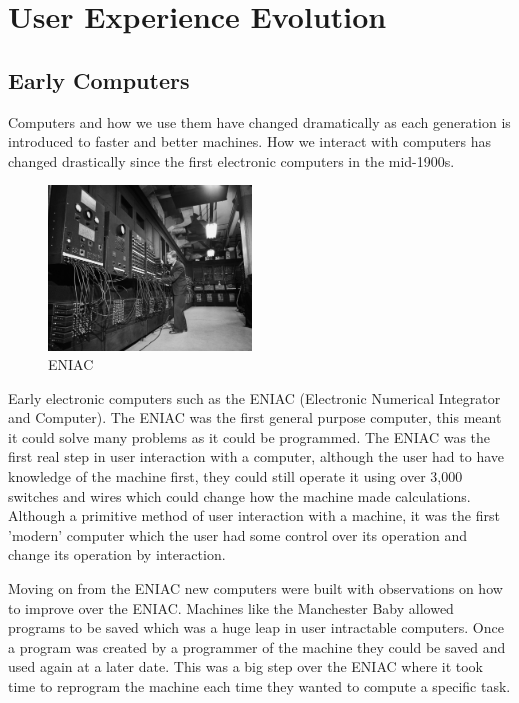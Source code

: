 \chapter{User Experience Evolution}

\section{Early Computers}
Computers and how we use them have changed dramatically as each generation is introduced to faster and better machines. How we interact with computers has changed drastically since the first electronic computers in the mid-1900s.

\begin{figure}
  \begin{center}
    \includegraphics[width=0.48\textwidth]{img/eniac.jpg}
  \end{center}
  \caption{ENIAC}
\end{figure}

Early electronic computers such as the ENIAC (Electronic Numerical Integrator and Computer). \cite{eniac} The ENIAC was the first general purpose computer, this meant it could solve many problems as it could be programmed. The ENIAC was the first real step in user interaction with a computer, although the user had to have knowledge of the machine first, they could still operate it using over 3,000 switches and wires which could change how the machine made calculations. \cite{eniac} Although a primitive method of user interaction with a machine, it was the first 'modern' computer which the user had some control over its operation and change its operation by interaction.

Moving on from the ENIAC new computers were built with observations on how to improve over the ENIAC. Machines like the Manchester Baby \cite{manchesterbaby} allowed programs to be saved which was a huge leap in user intractable computers. Once a program was created by a programmer of the machine they could be saved and used again at a later date. This was a big step over the ENIAC where it took time to reprogram the machine each time they wanted to compute a specific task.

\section{}
